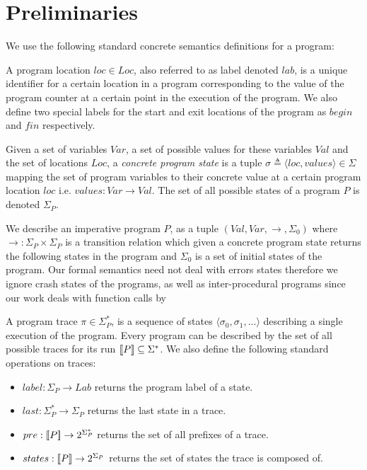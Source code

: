 \section{Preliminaries} 
We use the following standard concrete semantics definitions for a program:

A program location $loc \in Loc$, also referred to as label denoted $lab$, is a unique identifier for a certain location in a program corresponding to the value of the program counter at a certain point in the execution of the program. We also define two special labels for the start and exit locations of the program as $begin$ and $fin$ respectively.

Given a set of variables $Var$, a set of possible values for these variables $Val$ and the set of locations $Loc$, a \emph{concrete program state} is a tuple $\sigma \triangleq \langle loc, values \rangle \in \Sigma$ mapping the set of program variables to their concrete value at a certain program location $loc$ i.e. $values : Var \rightarrow Val$. The set of all possible states of a program $P$ is denoted $\Sigma_{P}$.

\begin{sloppypar}
We describe an imperative program $P$, as a tuple $(Val,Var,\rightarrow,\Sigma_{0})$ where $\rightarrow : \Sigma_{P} \times \Sigma_{P} $  is a transition relation which given a concrete program state returns the following states in the program and $\Sigma_{0}$ is a set of initial states of the program. Our formal semantics need not deal with errors states therefore we ignore crash states of the programs, as well as inter-procedural programs since our work deals with function calls by 
\end{sloppypar}

A program trace $\pi \in \Sigma^*_{P}$, is a sequence of states $\langle \sigma_0,\sigma_1,... \rangle$ describing a single execution of the program. Every program can be described by the set of all possible traces for its run $\lbrack\!\lbrack P \rbrack\!\rbrack \subseteq \Sigma^*$. We also define the following standard operations on traces:
\begin{itemize}
\item $label : \Sigma_{P} \rightarrow Lab$ returns the program label of a state.
\item $last : \Sigma_{P}^* \rightarrow \Sigma_{P}$ returns the last state in a trace.
\item $pre : \lbrack\!\lbrack P \rbrack\!\rbrack \rightarrow 2^{\Sigma_{P}^*}$ returns the set of all prefixes of a trace.
\item $states : \lbrack\!\lbrack P \rbrack\!\rbrack \rightarrow 2^{\Sigma_{P}}$ returns the set of states the trace is composed of.
\end{itemize}


